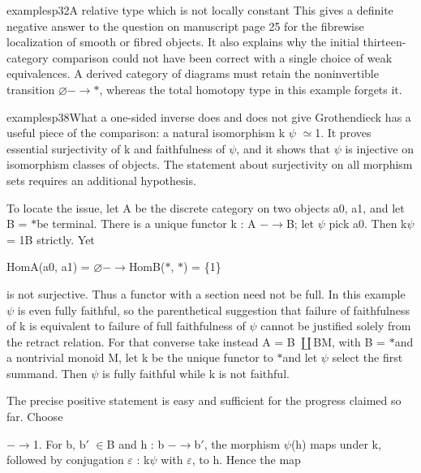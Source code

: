 \begin{dcomment}{examples}{p32}{A relative type which is not locally constant}
This gives a definite negative answer to the question on manuscript page 25 for the fibrewise localization of smooth or fibred objects. It also explains why the initial thirteen-category comparison could not have been correct with a single choice of weak equivalences. A derived category of diagrams must retain the noninvertible transition \ensuremath{\varnothing}\ensuremath{-}\ensuremath{\to}\ensuremath{*}, whereas the total homotopy type in this example forgets it.

\end{dcomment}

\begin{dcomment}{examples}{p38}{What a one-sided inverse does and does not give}
Grothendieck has a useful piece of the comparison: a natural isomorphism k\textasciimacron{} \ensuremath{\psi}\textasciimacron{} \ensuremath{\simeq}1. It proves essential surjectivity of k\textasciimacron{} and faithfulness of \ensuremath{\psi}\textasciimacron{}, and it shows that \ensuremath{\psi}\textasciimacron{} is injective on isomorphism classes of objects. The statement about surjectivity on all morphism sets requires an additional hypothesis.

To locate the issue, let A be the discrete category on two objects a0, a1, and let B = \ensuremath{*}be terminal. There is a unique functor k : A \ensuremath{-}\ensuremath{\to}B; let \ensuremath{\psi} pick a0. Then k\ensuremath{\psi} = 1B strictly. Yet

HomA(a0, a1) = \ensuremath{\varnothing}\ensuremath{-}\ensuremath{\to}HomB(\ensuremath{*}, \ensuremath{*}) = \{1\}

is not surjective. Thus a functor with a section need not be full. In this example \ensuremath{\psi} is even fully faithful, so the parenthetical suggestion that failure of faithfulness of k is equivalent to failure of full faithfulness of \ensuremath{\psi} cannot be justified solely from the retract relation. For that converse take instead A = B \ensuremath{\coprod}BM, with B = \ensuremath{*}and a nontrivial monoid M, let k be the unique functor to \ensuremath{*}and let \ensuremath{\psi} select the first summand. Then \ensuremath{\psi} is fully faithful while k is not faithful.

The precise positive statement is easy and sufficient for the progress claimed so far. Choose

\ensuremath{-}\ensuremath{\to}1. For b, b\ensuremath{\prime} \ensuremath{\in}B and h : b \ensuremath{-}\ensuremath{\to}b\ensuremath{\prime}, the morphism \ensuremath{\psi}(h) maps under k, followed by conjugation \ensuremath{\varepsilon} : k\ensuremath{\psi} with \ensuremath{\varepsilon}, to h. Hence the map


\end{dcomment}
